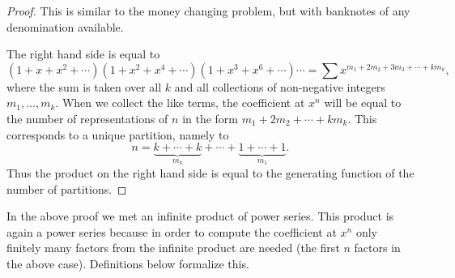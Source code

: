 \begin{proof}
This is similar to the money changing problem, but with banknotes of any denomination available.

The right hand side is equal to
\[
(1+x+x^2+\cdots)(1+x^2+x^4+\cdots)(1+x^3+x^6+\cdots)\cdots = \sum x^{m_1 + 2m_2 + 3m_3 + \cdots + km_k},
\]
where the sum is taken over all $k$ and all collections of non-negative integers $m_1, \ldots, m_k$.
When we collect the like terms, the coefficient at $x^n$ will be equal to the number of representations of $n$ in the form
$m_1 + 2m_2 + \cdots + km_k$.
This corresponds to a unique partition, namely to
\[
n = \underbrace{k+\cdots+k}_{m_k} + \cdots + \underbrace{1+\cdots+1}_{m_1}.
\]
Thus the product on the right hand side is equal to the generating function of the number of partitions.
\end{proof}

In the above proof we met an infinite product of power series.
This product is again a power series because in order to compute the coefficient at $x^n$
only finitely many factors from the infinite product are needed (the first $n$ factors in the above case).
Definitions below formalize this.
